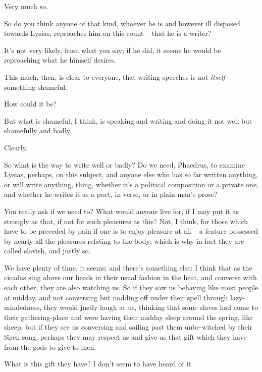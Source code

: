 Very much so.

So do you think anyone of that kind, whoever he is and however
ill disposed towards Lysias, reproaches him on this count -- that he is
a writer?

 It's not very likely, from what you say; if he did,
it seems he would be reproaching what he himself desires.

 This much, then, is clear to everyone, that writing
speeches is not {\em itself} something shameful.

How could it be?

But what is shameful, I think, is speaking and writing 
and doing it not well but shamefully and badly.

Clearly.

So what is the way to write well or badly? Do we need,
Phaedrus, to examine Lysias, perhaps, on this subject, and anyone else
who has so far written anything, or will write anything, thing,
 whether it's a political composition or a private one, and
whether he writes it as a poet, in verse, or in plain man's prose?

You really ask if we need to? What would anyone  live
for, if I may put it as strongly as that, if not for such pleasures as
this? Not, I think, for those which have to be preceded by pain if one
is to enjoy pleasure at all -- a feature possessed by nearly all the
pleasures relating to the body; which is why in fact they are called
slavish, and justly so.


We have plenty of time, it seems; and there's something else: I
think that as the cicadas sing above our heads in their usual fashion in
the heat, and converse
with each other,
 they are also watching us. So if they saw us behaving like
most people at midday, and not conversing but nodding off under their
spell through lazy-mindedness, they would justly laugh at us, thinking
that some slaves had come to their gathering-place  and were
having their midday sleep around the spring, like sheep; but if they see
us conversing and sailing past them unbe-witched by their Siren song,
perhaps they may respect us and  give us that gift which they
have from the gods to give to men.

What is this gift they have? I don't seem to have heard of it.

